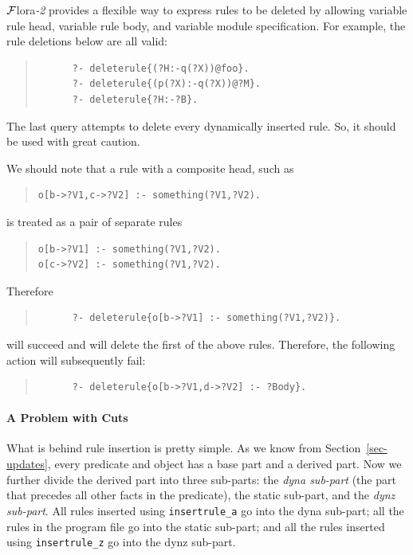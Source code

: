 \documentclass[11pt]{article}
\newcommand{\FLORA}{{\mbox{\sc ${\cal F}${lora}\rm\emph{-2}}}\xspace}
\begin{document}
\FLORA provides a flexible way to express rules to be deleted by
allowing variable rule head, variable rule body, and variable module
specification. For example, the rule deletions below are all valid:
\begin{quote}
\begin{verbatim}
      ?- deleterule{(?H:-q(?X))@foo}.
      ?- deleterule{(p(?X):-q(?X))@?M}.
      ?- deleterule{?H:-?B}.
\end{verbatim}
\end{quote}
The last query attempts to delete every dynamically inserted rule. So, it
should be used with great caution.

We should note that a rule with a composite head, such as 
\begin{quote}
   \begin{verbatim}
o[b->?V1,c->?V2] :- something(?V1,?V2).     
   \end{verbatim}
\end{quote}
is treated as a pair of separate rules
\begin{quote}
\begin{verbatim}
o[b->?V1] :- something(?V1,?V2).     
o[c->?V2] :- something(?V1,?V2).     
\end{verbatim}
\end{quote}
Therefore
\begin{quote}
\begin{verbatim}
      ?- deleterule{o[b->?V1] :- something(?V1,?V2)}.
\end{verbatim}
\end{quote}
will succeed and will delete the first of the above rules.
Therefore, the following action will subsequently fail:
\begin{quote}
\begin{verbatim}
      ?- deleterule{o[b->?V1,d->?V2] :- ?Body}.
\end{verbatim}
\end{quote}



\paragraph{A Problem with Cuts} What is behind rule insertion is pretty
simple. As we know from Section~\ref{sec-updates}, every predicate and
object has a base part and a derived part. Now we further divide the
derived part into three sub-parts: the \emph{dyna sub-part} (the part that
precedes all other facts in the predicate), the static sub-part, and the
\emph{dynz sub-part}. All rules inserted using {\tt insertrule\_a} go into
the dyna sub-part; all the rules in the program file go into the static
sub-part; and all the rules inserted using {\tt insertrule\_z} go into the
dynz sub-part.
\end{document}
